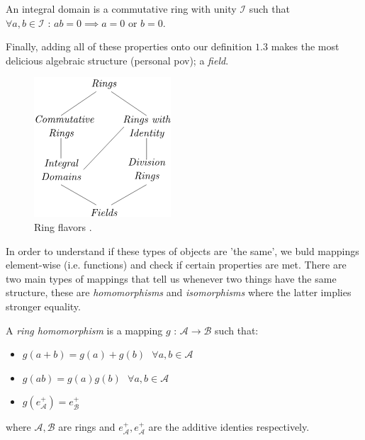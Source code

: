 \vspace{0.3cm}

\begin{definition}
    An integral domain is a commutative ring with unity $\mathcal{I}$ such that $\forall a,b \in \mathcal{I} \text{ : } ab = 0 \implies a = 0 \text{ or } b = 0$.    
\end{definition}

\vspace{0.3cm}

Finally, adding all of these properties onto our definition $1.3$ makes the most delicious algebraic structure (personal pov); a \textit{field}.

\begin{figure}[h!] %
    \centering
    \includegraphics[scale=0.5]{figures/ring_flavors.png} %
    \caption{Ring flavors \cite{judson2019abstract}.}
    \label{fig:flav-ring}
\end{figure}

In order to understand if these types of objects are 'the same', we buld mappings element-wise (i.e. functions) and check if certain properties are met.
There are two main types of mappings that tell us whenever two things have the same structure, these are \textit{homomorphisms} and \textit{isomorphisms} where the latter implies stronger equality.

\vspace{0.3cm}

\begin{definition}
    A \textit{ring homomorphism} is a mapping $g \text{ : }  \mathcal{A} \rightarrow \mathcal{B}$ such that: 
    \begin{itemize}
        \item $g(a+b) = g(a) + g(b) \text{ } \forall a,b \in \mathcal{A}$
        \item $g(ab) = g(a) g(b) \text{ } \forall a,b \in \mathcal{A}$
        \item $g(e^+_{\mathcal{A}}) = e^+_{\mathcal{B}}$
    \end{itemize}
    where $\mathcal{A}, \mathcal{B}$ are rings and $e^+_{\mathcal{A}}, e^+_{\mathcal{A}}$ are the additive identies respectively.
\end{definition}

